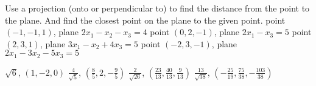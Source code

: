 
\begin{Exercise}[
name={},
title={}, 
difficulty=0,
origin={\cite{SM, YL}}]
Use a projection (onto or perpendicular to) to find the distance from the point to the plane. And find the closest point on the plane to the given point.
\Question point $(-1,-1,1)$, plane $2x_1-x_2-x_3=4$
\Question point $(0,2,-1)$, plane $2x_1-x_3=5$
\Question point $(2,3,1)$, plane $3x_1-x_2+4x_3=5$
\Question point $(-2,3,-1)$, plane $2x_1-3x_2-5x_3=5$
\end{Exercise}

\begin{Answer}
\begin{multicols}{2}
\Question $\sqrt{6}$, $(1,-2,0)$
\Question $\frac{4}{\sqrt{5}}$, $\left(\frac85, 2, -\frac95\right)$
\Question $\frac{2}{\sqrt{26}}$, $\left(\frac{23}{13}, \frac{40}{13}, \frac{9}{13}\right)$
\Question $\frac{13}{\sqrt{38}}$, $\left(-\frac{25}{19}, \frac{75}{38}, -\frac{103}{38}\right)$
\EndCurrentQuestion
\end{multicols}
\end{Answer}
